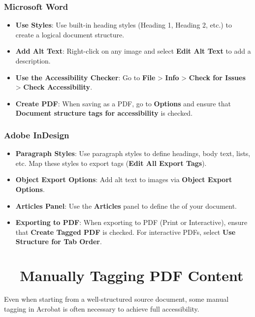 \subsubsection{Microsoft Word}
\label{ssubsec:ms-word-pdf}
\begin{itemize}
	\item \textbf{Use Styles}: Use built-in heading styles (Heading 1, Heading 2, etc.) to create a logical document structure.
	\item \textbf{Add Alt Text}: Right-click on any image and select \textbf{Edit Alt Text} to add a description.
	\item \textbf{Use the Accessibility Checker}: Go to \textbf{File} > \textbf{Info} > \textbf{Check for Issues} > \textbf{Check Accessibility}.
	\item \textbf{Create PDF}: When saving as a PDF, go to \textbf{Options} and ensure that \textbf{Document structure tags for accessibility} is checked.
\end{itemize}

\subsubsection{Adobe InDesign}
\label{ssubsec:adobe-indesign-pdf}
\begin{itemize}
	\item \textbf{Paragraph Styles}: Use paragraph styles to define headings, body text, lists, etc. Map these styles to export tags (\textbf{Edit All Export Tags}).
	\item \textbf{Object Export Options}: Add alt text to images via \textbf{Object Export Options}.
	\item \textbf{Articles Panel}: Use the \textbf{Articles} panel to define the  of your document.
	\item \textbf{Exporting to PDF}: When exporting to PDF (Print or Interactive), ensure that \textbf{Create Tagged PDF} is checked. For interactive PDFs, select \textbf{Use Structure for Tab Order}.
\end{itemize}

\section{~~Manually Tagging PDF Content}
\label{sec:manual-tagging-pdf}
Even when starting from a well-structured source document, some manual tagging in Acrobat is often necessary to achieve full accessibility.

